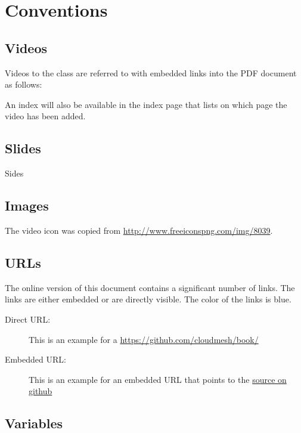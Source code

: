 \section{Conventions}

\subsection{Videos}

Videos to the class are referred to with embedded links into the PDF
document as follows: 


An index will also be available in the index page
that lists on which page the video has been added.

\subsection{Slides}

Sides

\subsection{Images}

The video icon was copied from \url{http://www.freeiconspng.com/img/8039}.

\subsection{URLs}

The online version of this document contains a significant number of
links. The links are either embedded or are directly visible. The
color of the links is blue.

\begin{description}
\item[Direct URL:] This is an example for a
  \url{https://github.com/cloudmesh/book/}
\item[Embedded URL:] This is an example for an embedded URL that
  points to the \href{https://github.com/cloudmesh/book/}{source on github}
\end{description}

\subsection{Variables}


